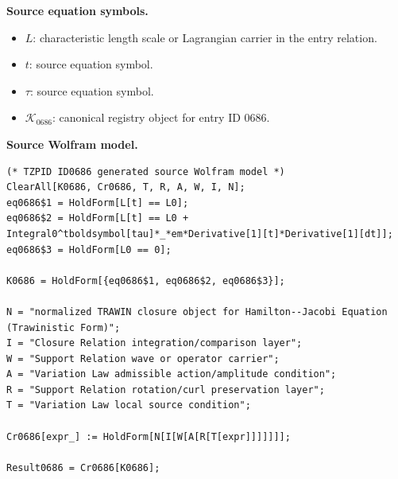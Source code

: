 \begin{minipage}[t]{0.49\linewidth}
\begingroup
\small
\raggedright
\textbf{Source equation symbols.}\par
\begin{itemize}[leftmargin=1.35em,itemsep=1pt,topsep=1pt,parsep=0pt]
    \item $L$: characteristic length scale or Lagrangian carrier in the entry relation.
    \item $t$: source equation symbol.
    \item $\tau$: source equation symbol.
    \item $\mathcal{K}_{0686}$: canonical registry object for entry ID 0686.
\end{itemize}
\endgroup
\end{minipage}\hfill
\begin{minipage}[t]{0.47\linewidth}
\begingroup
\scriptsize
\raggedright
\textbf{Source Wolfram model.}\par
\begin{Verbatim}[fontsize=\tiny,breaklines=true,breakanywhere=true]
(* TZPID ID0686 generated source Wolfram model *)
ClearAll[K0686, Cr0686, T, R, A, W, I, N];
eq0686$1 = HoldForm[L[t] == L0];
eq0686$2 = HoldForm[L[t] == L0 + Integral0^tboldsymbol[tau]*_*em*Derivative[1][t]*Derivative[1][dt]];
eq0686$3 = HoldForm[L0 == 0];

K0686 = HoldForm[{eq0686$1, eq0686$2, eq0686$3}];

N = "normalized TRAWIN closure object for Hamilton--Jacobi Equation (Trawinistic Form)";
I = "Closure Relation integration/comparison layer";
W = "Support Relation wave or operator carrier";
A = "Variation Law admissible action/amplitude condition";
R = "Support Relation rotation/curl preservation layer";
T = "Variation Law local source condition";

Cr0686[expr_] := HoldForm[N[I[W[A[R[T[expr]]]]]]];

Result0686 = Cr0686[K0686];
\end{Verbatim}
\endgroup
\end{minipage}


